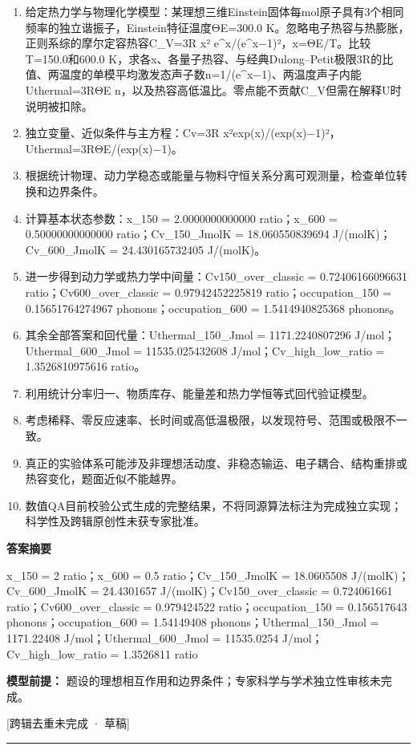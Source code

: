 \documentclass[UTF8,11pt,a4paper]{ctexart}
\begin{document}
\begin{enumerate}
\item 给定热力学与物理化学模型：某理想三维Einstein固体每mol原子具有3个相同频率的独立谐振子，Einstein特征温度ΘE=300.0 K。忽略电子热容与热膨胀，正则系综的摩尔定容热容C\_V=3R x² e\textasciicircum{}x/(e\textasciicircum{}x−1)²，x=ΘE/T。比较T=150.0和600.0 K，求各x、各量子热容、与经典Dulong–Petit极限3R的比值、两温度的单模平均激发态声子数n=1/(e\textasciicircum{}x−1)、两温度声子内能Uthermal=3RΘE n，以及热容高低温比。零点能不贡献C\_V但需在解释U时说明被扣除。
\item 独立变量、近似条件与主方程：Cv=3R x²exp(x)/(exp(x)−1)²，Uthermal=3RΘE/(exp(x)−1)。
\item 根据统计物理、动力学稳态或能量与物料守恒关系分离可观测量，检查单位转换和边界条件。
\item 计算基本状态参数：x\_150 = 2.0000000000000 ratio；x\_600 = 0.50000000000000 ratio；Cv\_150\_JmolK = 18.060550839694 J/(molK)；Cv\_600\_JmolK = 24.430165732405 J/(molK)。
\item 进一步得到动力学或热力学中间量：Cv150\_over\_classic = 0.72406166096631 ratio；Cv600\_over\_classic = 0.97942452225819 ratio；occupation\_150 = 0.15651764274967 phonons；occupation\_600 = 1.5414940825368 phonons。
\item 其余全部答案和回代量：Uthermal\_150\_Jmol = 1171.2240807296 J/mol；Uthermal\_600\_Jmol = 11535.025432608 J/mol；Cv\_high\_low\_ratio = 1.3526810975616 ratio。
\item 利用统计分率归一、物质库存、能量差和热力学恒等式回代验证模型。
\item 考虑稀释、零反应速率、长时间或高低温极限，以发现符号、范围或极限不一致。
\item 真正的实验体系可能涉及非理想活动度、非稳态输运、电子耦合、结构重排或热容变化，题面近似不能越界。
\item 数值QA目前校验公式生成的完整结果，不将同源算法标注为完成独立实现；科学性及跨辑原创性未获专家批准。
\end{enumerate}
\noindent\textbf{答案摘要}\par
x\_150 = 2 ratio；x\_600 = 0.5 ratio；Cv\_150\_JmolK = 18.0605508 J/(molK)；Cv\_600\_JmolK = 24.4301657 J/(molK)；Cv150\_over\_classic = 0.724061661 ratio；Cv600\_over\_classic = 0.979424522 ratio；occupation\_150 = 0.156517643 phonons；occupation\_600 = 1.54149408 phonons；Uthermal\_150\_Jmol = 1171.22408 J/mol；Uthermal\_600\_Jmol = 11535.0254 J/mol；Cv\_high\_low\_ratio = 1.3526811 ratio\par
\noindent\textbf{模型前提：}
题设的理想相互作用和边界条件；专家科学与学术独立性审核未完成。\par
\noindent\textcolor{red!65!black}{[跨辑去重未完成 · 草稿]} \par
\medskip\hrule\medskip
{}
\end{document}
